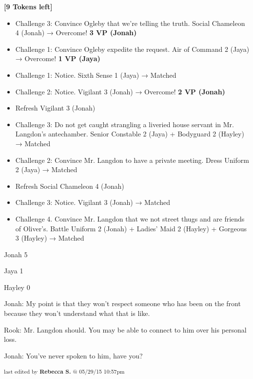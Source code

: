 \textbf{{[}9 Tokens left{]}}





\begin{itemize}
\item Challenge 3: Convince Ogleby that we're telling the truth. Social Chameleon 4 (Jonah) → Overcome! \textbf{3 VP (Jonah)}
\item Challenge 1: Convince Ogleby expedite the request. Air of Command 2 (Jaya) → Overcome! \textbf{1 VP (Jaya)}
\item Challenge 1: Notice. Sixth Sense 1 (Jaya) → Matched
\item Challenge 2: Notice. Vigilant 3 (Jonah) → Overcome! \textbf{2 VP (Jonah)}
\item Refresh Vigilant 3 (Jonah)
\item Challenge 3: Do not get caught strangling a liveried house servant in Mr. Langdon's antechamber. Senior Constable 2 (Jaya) + Bodyguard 2 (Hayley) → Matched
\item Challenge 2: Convince Mr. Langdon to have a private meeting. Dress Uniform 2 (Jaya) → Matched
\item Refresh Social Chameleon 4 (Jonah)
\item Challenge 3: Notice. Vigilant 3 (Jonah) → Matched
\item Challenge 4.  Convince Mr. Langdon that we not street thugs and are friends of Oliver's.  Battle Uniform 2 (Jonah) + Ladies' Maid 2 (Hayley) + Gorgeous 3 (Hayley)  → Matched
\end{itemize}



Jonah 5

Jaya 1

Hayley 0



Jonah: My point is that they won't respect someone who has been on the front because they won't understand what that is like.

Rook: Mr. Langdon should.  You may be able to connect to him over his personal loss.

Jonah: You've never spoken to him, have you?




\vspace{\fill}

\begin{flushright}
\textsubscript{last edited by \textbf{Rebecca S.} @ 05/29/15 10:57pm}
\end{flushright}

